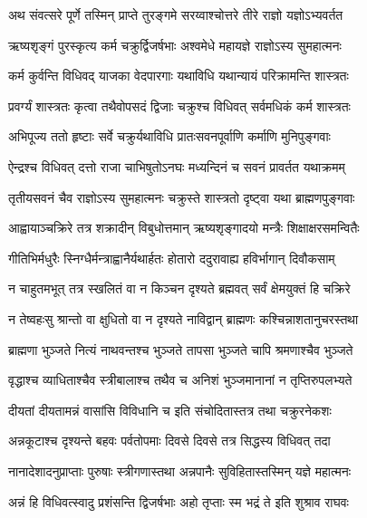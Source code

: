 
\twolineshloka
{अथ संवत्सरे पूर्णे तस्मिन् प्राप्ते तुरङ्गमे}
{सरय्वाश्चोत्तरे तीरे राज्ञो यज्ञोऽभ्यवर्तत} %

\twolineshloka
{ऋष्यशृङ्गं पुरस्कृत्य कर्म चक्रुर्द्विजर्षभाः}
{अश्वमेधे महायज्ञे राज्ञोऽस्य सुमहात्मनः} %

\twolineshloka
{कर्म कुर्वन्ति विधिवद् याजका वेदपारगाः}
{यथाविधि यथान्यायं परिक्रामन्ति शास्त्रतः} %

\twolineshloka
{प्रवर्ग्यं शास्त्रतः कृत्वा तथैवोपसदं द्विजाः}
{चक्रुश्च विधिवत् सर्वमधिकं कर्म शास्त्रतः} %

\twolineshloka
{अभिपूज्य ततो हृष्टाः सर्वे चक्रुर्यथाविधि}
{प्रातःसवनपूर्वाणि कर्माणि मुनिपुङ्गवाः} %

\twolineshloka
{ऐन्द्रश्च विधिवत् दत्तो राजा चाभिषुतोऽनघः}
{मध्यन्दिनं च सवनं प्रावर्तत यथाक्रमम्} %

\twolineshloka
{तृतीयसवनं चैव राज्ञोऽस्य सुमहात्मनः}
{चक्रुस्ते शास्त्रतो दृष्ट्वा यथा ब्राह्मणपुङ्गवाः} %

\twolineshloka
{आह्वायाञ्चक्रिरे तत्र शक्रादीन् विबुधोत्तमान्}
{ऋष्यशृङ्गादयो मन्त्रैः शिक्षाक्षरसमन्वितैः} %

\twolineshloka
{गीतिभिर्मधुरैः स्निग्धैर्मन्त्राह्वानैर्यथार्हतः}
{होतारो ददुरावाह्य हविर्भागान् दिवौकसाम्} %

\twolineshloka
{न चाहुतमभूत् तत्र स्खलितं वा न किञ्चन}
{दृश्यते ब्रह्मवत् सर्वं क्षेमयुक्तं हि चक्रिरे} %

\twolineshloka
{न तेष्वहःसु श्रान्तो वा क्षुधितो वा न दृश्यते}
{नाविद्वान् ब्राह्मणः कश्चिन्नाशतानुचरस्तथा} %

\twolineshloka
{ब्राह्मणा भुञ्जते नित्यं नाथवन्तश्च भुञ्जते}
{तापसा भुञ्जते चापि श्रमणाश्चैव भुञ्जते} %

\twolineshloka
{वृद्धाश्च व्याधिताश्चैव स्त्रीबालाश्च तथैव च}
{अनिशं भुञ्जमानानां न तृप्तिरुपलभ्यते} %

\twolineshloka
{दीयतां दीयतामन्नं वासांसि विविधानि च}
{इति संचोदितास्तत्र तथा चक्रुरनेकशः} %

\twolineshloka
{अन्नकूटाश्च दृश्यन्ते बहवः पर्वतोपमाः}
{दिवसे दिवसे तत्र सिद्धस्य विधिवत् तदा} %

\twolineshloka
{नानादेशादनुप्राप्ताः पुरुषाः स्त्रीगणास्तथा}
{अन्नपानैः सुविहितास्तस्मिन् यज्ञे महात्मनः} %

\twolineshloka
{अन्नं हि विधिवत्स्वादु प्रशंसन्ति द्विजर्षभाः}
{अहो तृप्ताः स्म भद्रं ते इति शुश्राव राघवः} %

